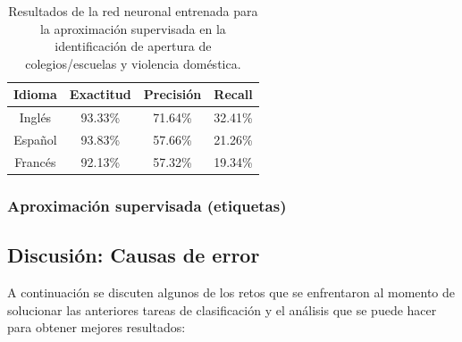 \begin{table}[H]
    \centering
    \begin{tabular}{|c|c|c|c|}
        \textbf{Idioma} & \textbf{Exactitud} & \textbf{Precisión} & \textbf{Recall} \\ \hline
        Inglés & 93.33\% & 71.64\% & 32.41\% \\
        Español & 93.83\% & 57.66\% & 21.26\% \\
        Francés & 92.13\% & 57.32\% & 19.34\% \\
    \end{tabular}
    \caption{Resultados de la red neuronal entrenada para la aproximación supervisada en la identificación de apertura de colegios/escuelas y violencia doméstica.}
    \label{tab:dc_supervised_metrics_3}
\end{table}

\subsubsection{Aproximación supervisada (etiquetas)}


\subsection{Discusión: Causas de error}

A continuación se discuten algunos de los retos que se enfrentaron al momento de solucionar las anteriores tareas de clasificación y el análisis que se puede hacer para obtener mejores resultados:

